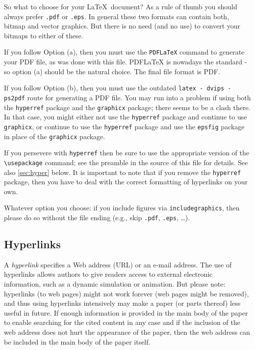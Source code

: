 \documentclass{scspaperproc}
\theoremstyle{scsthe}
\begin{document}
So what to choose for your \LaTeX\ document? As a rule of thumb you should always prefer \texttt{.pdf} or \texttt{.eps}.
In general these two formats can contain both, bitmap and vector graphics. But there is no need (and no use) to convert your bitmaps to either of these.

If you follow Option (a), then you must use the \texttt{PDFLaTeX} command to generate your PDF file, as was done with this file. PDFLaTeX is nowadays the standard - so option (a) should be the natural choice. The final file format is PDF.

If you follow Option (b), then you must use the outdated \texttt{latex - dvips - ps2pdf} route for generating a PDF file. You may run into a problem if using both the \texttt{hyperref} package and the \texttt{graphicx} package; there seems to be a clash there.
In that case, you might either not use the \texttt{hyperref} package and continue to use \texttt{graphicx}, or continue to use the \texttt{hyperref} package and use the \texttt{epsfig} package in place of the \texttt{graphicx} package.

If you persevere with \texttt{hyperref} then be sure to use the appropriate version of the \verb+\usepackage+ command; see the preamble in the source of this file for details. See also \autoref{sec:hyper} below. It is important to note that if you remove the \texttt{hyperref} package, then you have to deal with the correct formatting of hyperlinks on your own.

Whatever option you choose: if you include figures via \texttt{includegraphics}, then please do so without the file ending (e.g., skip \texttt{.pdf}, \texttt{.eps}, \ldots).


\subsection{Hyperlinks}
\label{sec:hyper}

A \emph{hyperlink} specifies a Web address (URL) or an e-mail address. The use of hyperlinks allows authors to give readers access to external electronic information, such as a dynamic simulation or animation. 
But please note: hyperlinks (to web pages) might not work forever (web pages might be removed), and thus using hyperlinks intensively may make a paper (or parts thereof) less useful in future. If enough information is provided in the main body of the paper to enable searching for the cited content in any case and if the inclusion of the web address does not hurt the appearance of the paper, then the web address can be included in the main body of the paper itself.
\end{document}
